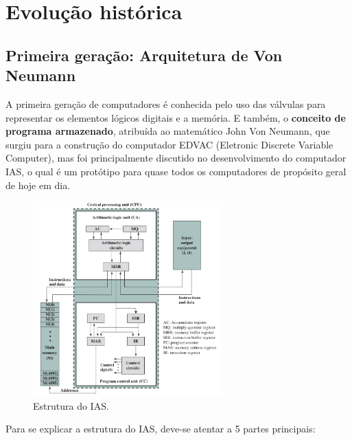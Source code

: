 \documentclass{article}
\begin{document}
\section{Evolução histórica}
\subsection{Primeira geração: Arquitetura de Von Neumann}
A primeira geração de computadores é conhecida pelo uso das válvulas para
representar os elementos lógicos digitais e a memória. E também, o
\textbf{conceito de programa armazenado}, atribuída ao matemático John Von
Neumann, que surgiu para a construção do computador EDVAC (Eletronic Discrete
Variable Computer), mas foi principalmente discutido no desenvolvimento do
computador IAS, o qual é um protótipo para quase todos os computadores de
propósito geral de hoje em dia.

\begin{figure}[h]
    \centering
    \includegraphics[width=0.65\textwidth]{ias.png}
    \caption{Estrutura do IAS.}
\end{figure}

Para se explicar a estrutura do IAS, deve-se atentar a 5 partes principais:
\end{document}
